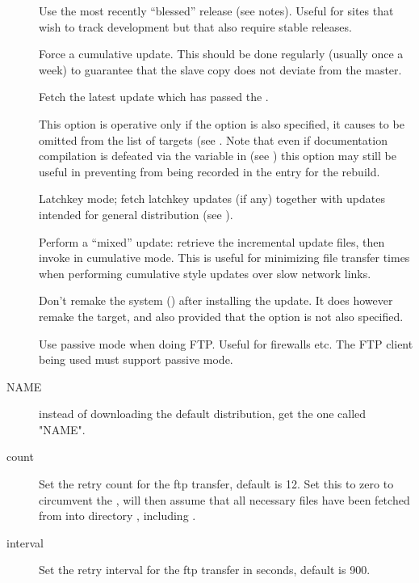 \begin{description}
\item[]
   Use the most recently ``blessed'' release (see notes).  Useful for
   sites that wish to track development but that also require stable
   releases.

\item[]
   Force a cumulative update.  This should be done regularly (usually once a
   week) to guarantee that the slave copy does not deviate from the master.

\item[]
   Fetch the latest update which has passed the .

\item[]
   This option is operative only if the  option is also specified, it
   causes  to be omitted from the list of targets (see
   .  Note that even if documentation compilation is
   defeated via the  variable in  (see
   ) this option may still be useful in preventing
    from being recorded in the  entry for the
   rebuild.

\item[]
   Latchkey mode; fetch latchkey updates (if any) together with updates
   intended for general distribution (see ).

\item[]
   Perform a ``mixed'' update: retrieve the incremental update files,
   then invoke  in cumulative mode.  This is useful for
   minimizing file transfer times when performing cumulative style
   updates over slow network links.

\item[]
   Don't remake the system () after installing the update.  It
   does however remake the  target, and also 
   provided that the  option is not also specified.

\item[]
  Use passive mode when doing FTP. Useful for firewalls etc. The
  FTP client being used must support passive mode.

\item[ NAME]
  instead of downloading the default distribution, get the one called "NAME".

\item[ count]
   Set the retry count for the ftp transfer, default is 12.  Set this to zero
   to circumvent the ,  will then assume that all
   necessary files have been fetched from  into directory
   , including .

\item[ interval]
   Set the retry interval for the ftp transfer in seconds, default is 900.
\end{description}

